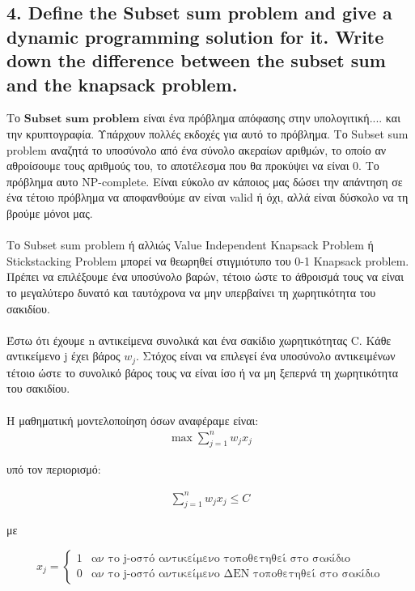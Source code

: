 \documentclass[12pt]{article}
\begin{document}
\pagebreak

\subsection*{4. Define the Subset sum problem and give a dynamic programming solution for
	it. Write down the difference between the subset sum and the knapsack problem.}

Το \(\textbf{Subset sum problem}\) είναι ένα πρόβλημα απόφασης στην υπολογιτική.... και την κρυπτογραφία. Υπάρχουν πολλές εκδοχές για αυτό το πρόβλημα. Το Subset sum problem αναζητά το υποσύνολο από ένα σύνολο ακεραίων αριθμών, το οποίο αν αθροίσουμε τους αριθμούς του, το αποτέλεσμα που θα προκύψει να είναι 0. Το πρόβλημα αυτο NP-complete. Είναι εύκολο αν κάποιος μας δώσει την απάντηση σε ένα τέτοιο πρόβλημα να αποφανθούμε αν είναι valid ή όχι, αλλά είναι δύσκολο να τη βρούμε μόνοι μας. \\ \\

Το Subset sum problem ή αλλιώς Value Independent Knapsack Problem ή Stickstacking Problem μπορεί να θεωρηθεί στιγμιότυπο του 0-1 Knapsack problem. Πρέπει να επιλέξουμε ένα υποσύνολο βαρών, τέτοιο ώστε το άθροισμά τους να είναι το μεγαλύτερο δυνατό και ταυτόχρονα να μην υπερβαίνει τη χωρητικότητα του σακιδίου. \\ \\

Έστω ότι έχουμε n αντικείμενα συνολικά και ένα σακίδιο χωρητικότητας C. Κάθε αντικείμενο j έχει βάρος \(w_{j}\). Στόχος είναι να επιλεγεί ένα υποσύνολο αντικειμένων τέτοιο ώστε το συνολικό βάρος τους να είναι ίσο ή να μη ξεπερνά τη χωρητικότητα του σακιδίου. \\ \\ 

Η μαθηματική μοντελοποίηση όσων αναφέραμε είναι: \\

\begin{align*}
	\max \sum_{j=1}^{n}{w_{j}x_{j}}
\end{align*} 

υπό τον περιορισμό:

\begin{align*}
	\sum_{j=1}^{n}{w_{j}x_{j}} \leq C
\end{align*}

με 

 \[ x_{j} = 
\begin{cases} 
1 & \text{αν το j-οστό αντικείμενο τοποθετηθεί στο σακίδιο} \\
0 & \text{αν το j-οστό αντικείμενο ΔΕΝ τοποθετηθεί στο σακίδιο}
\end{cases}
\]
\end{document}

